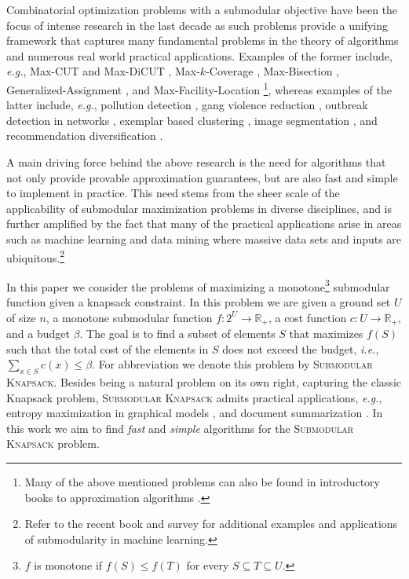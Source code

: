 \documentclass[a4paper,UKenglish,cleveref, autoref]{lipics-v2019}
\newcommand{\SK}{{\textsc{Submodular Knapsack}}\xspace}
\begin{document}
Combinatorial optimization problems with a submodular objective have been the focus of intense research in the last decade as such problems provide a unifying framework that captures many fundamental problems in the theory of algorithms and numerous real world practical applications.
Examples of the former include, {\em e.g.}, Max-CUT and Max-DiCUT \cite{FG95,GW95,HZ01,H01,K72,KKMO07,LLZ02,TSSW00}, Max-$k$-Coverage \cite{F98,SW11,V01}, Max-Bisection \cite{ABG13,FJ97,HZ02,Y01}, Generalized-Assignment \cite{CK05,CKR06,FGMS06,FV06}, and Max-Facility-Location \cite{AS99,CFN77a,CFN77b}\footnote{Many of the above mentioned problems can also be found in introductory books to approximation algorithms \cite{SW11,V01}.}, whereas examples of the latter include, {\em e.g.}, pollution detection \cite{KLGVF08}, gang violence reduction \cite{SSPB14}, outbreak detection in networks \cite{LKGFFVG07}, exemplar based clustering \cite{GK10}, image segmentation \cite{KXFK11}, and recommendation diversification \cite{YG11}.

A main driving force behind the above research is the need for algorithms that not only provide provable approximation guarantees, but are also fast and  simple to implement in practice.
This need stems from the sheer scale of the applicability of submodular maximization problems in diverse disciplines, and is further amplified by the fact that many of the practical applications arise in areas such as machine learning and data mining where massive data sets and inputs are ubiquitous.\footnote{Refer to the recent book \cite{B13} and survey \cite{KG14} for additional examples and applications of submodularity in machine learning.}



In this paper we consider the problems of maximizing a monotone\footnote{
    $f$ is monotone if $f(S) \leq f(T)$ for every $S \subseteq T \subseteq U$.
} submodular function given a knapsack constraint.
In this problem we are given a ground set
$U$ of size $n$, a monotone submodular function $f:2^U \to \mathbb{R}_+$, a cost function $c:U \to \mathbb{R}_+$, and a budget $\beta$.
The goal is to find a subset of elements $S$ that maximizes $f(S)$ such that the total cost of the elements in $S$ does not exceed the budget, {\em i.e.}, $\sum _{x\in S}c(x)\leq \beta$.
For abbreviation we denote this problem by \SK.
Besides being a natural problem on its own right, capturing the classic Knapsack problem, \SK admits practical applications, {\em e.g.}, entropy maximization in graphical models \cite{krause2005note}, and document summarization \cite{LB10}.
In this work we aim to find {\em fast} and {\em simple} algorithms for the \SK problem.
\end{document}
